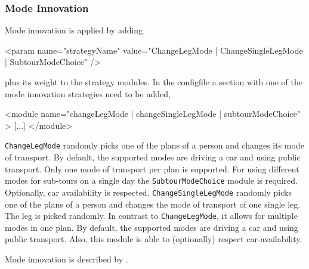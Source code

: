 \subsubsection{Mode Innovation}
\label{sec:modechoice}
Mode innovation is applied by adding 
%
\begin{xml}
	<param name="strategyName" value="{ChangeLegMode | ChangeSingleLegMode | SubtourModeChoice}" />
\end{xml}
%
plus its weight to the strategy modules. In the \gls{configfile} a section with one of the mode innovation strategies need to be added, \ie 
%
\begin{xml}
<module name="{changeLegMode | changeSingleLegMode | subtourModeChoice}" >
    [...]
</module>
\end{xml}
%
\lstinline|ChangeLegMode| randomly picks one of the plans of a person and changes its mode of transport. By default, the supported modes are driving a car and using public transport. Only one mode of transport per plan is supported. For using different modes for sub-tours on a single day the \lstinline|SubtourModeChoice| module is required. Optionally, car availability is respected. \lstinline|ChangeSingleLegMode| randomly picks one of the plans of a person and changes the mode of transport of one single leg. The leg is picked randomly. In contrast to \lstinline|ChangeLegMode|, it allows for multiple modes in one plan. By default, the supported modes are driving a car and using public transport. Also, this module is able to (optionally) respect car-availability.

Mode innovation is described by \citet[][]{RieserEtAl_TRR_2009, MeisterEtAl_WCTRS_2010, CiariEtAl_STRC_2008, CiariEtAl_STRC_2007}.

